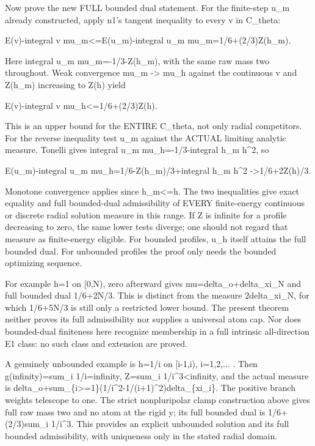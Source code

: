 \documentclass[11pt]{article}
\begin{document}
Now prove the new FULL bounded dual statement. For the finite-step u\_m already constructed, apply n1's tangent inequality to every v in C\_theta:

E(v)-integral v mu\_m<=E(u\_m)-integral u\_m mu\_m=1/6+(2/3)Z(h\_m).

Here integral u\_m mu\_m=-1/3-Z(h\_m), with the same raw mass two throughout. Weak convergence mu\_m -> mu\_h against the continuous v and Z(h\_m) increasing to Z(h) yield

E(v)-integral v mu\_h<=1/6+(2/3)Z(h).

This is an upper bound for the ENTIRE C\_theta, not only radial competitors. For the reverse inequality test u\_m against the ACTUAL limiting analytic measure. Tonelli gives integral u\_m mu\_h=-1/3-integral h\_m h\textasciicircum{}2, so

E(u\_m)-integral u\_m mu\_h=1/6-Z(h\_m)/3+integral h\_m h\textasciicircum{}2
                         ->1/6+2Z(h)/3.

Monotone convergence applies since h\_m<=h. The two inequalities give exact equality and full bounded-dual admissibility of EVERY finite-energy continuous or discrete radial solution measure in this range. If Z is infinite for a profile decreasing to zero, the same lower tests diverge; one should not regard that measure as finite-energy eligible. For bounded profiles, u\_h itself attains the full bounded dual. For unbounded profiles the proof only needs the bounded optimizing sequence.

For example h=1 on [0,N), zero afterward gives mu=delta\_o+delta\_xi\_N and full bounded dual 1/6+2N/3. This is distinct from the measure 2delta\_xi\_N, for which 1/6+5N/3 is still only a restricted lower bound. The present theorem neither proves its full admissibility nor supplies a universal atom cap. Nor does bounded-dual finiteness here recognize membership in a full intrinsic all-direction E1 class: no such class and extension are proved.

A genuinely unbounded example is h=1/i on [i-1,i), i=1,2,... . Then g(infinity)=sum\_i 1/i=infinity, Z=sum\_i 1/i\textasciicircum{}3<infinity, and the actual measure is delta\_o+sum\_\{i>=1\}(1/i\textasciicircum{}2-1/(i+1)\textasciicircum{}2)delta\_\{xi\_i\}. The positive branch weights telescope to one. The strict nonpluripolar clamp construction above gives full raw mass two and no atom at the rigid y; its full bounded dual is 1/6+(2/3)sum\_i 1/i\textasciicircum{}3. This provides an explicit unbounded solution and its full bounded admissibility, with uniqueness only in the stated radial domain.
\end{document}
